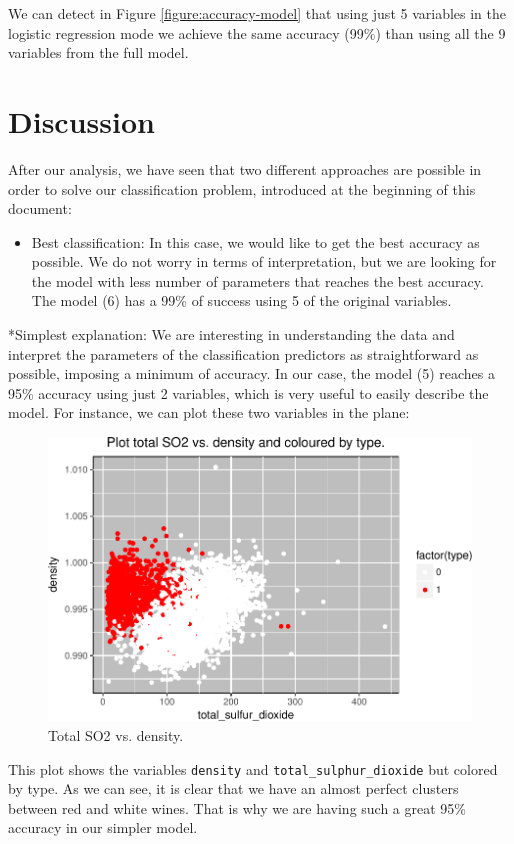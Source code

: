 \documentclass[12pt,]{article}
\providecommand{\tightlist}{%
  \setlength{\itemsep}{0pt}\setlength{\parskip}{0pt}}
\begin{document}
We can detect in Figure \ref{figure:accuracy-model} that using just 5
variables in the logistic regression mode we achieve the same accuracy
(99\%) than using all the 9 variables from the full model.

\section{Discussion}\label{discussion}

After our analysis, we have seen that two different approaches are
possible in order to solve our classification problem, introduced at the
beginning of this document:

\begin{itemize}
\tightlist
\item
  Best classification: In this case, we would like to get the best
  accuracy as possible. We do not worry in terms of interpretation, but
  we are looking for the model with less number of parameters that
  reaches the best accuracy. The model (6) has a 99\% of success using 5
  of the original variables.
\end{itemize}

*Simplest explanation: We are interesting in understanding the data and
interpret the parameters of the classification predictors as
straightforward as possible, imposing a minimum of accuracy. In our
case, the model (5) reaches a 95\% accuracy using just 2 variables,
which is very useful to easily describe the model. For instance, we can
plot these two variables in the plane:

\begin{figure}[h]

{\centering \includegraphics{logistic-regression_files/figure-latex/two_variables_plot-1} 

}

\caption{Total SO2 vs. density.}\label{fig:two_variables_plot}
\end{figure}

This plot shows the variables \texttt{density} and
\texttt{total\_sulphur\_dioxide} but colored by type. As we can see, it
is clear that we have an almost perfect clusters between red and white
wines. That is why we are having such a great 95\% accuracy in our
simpler model.
\end{document}
